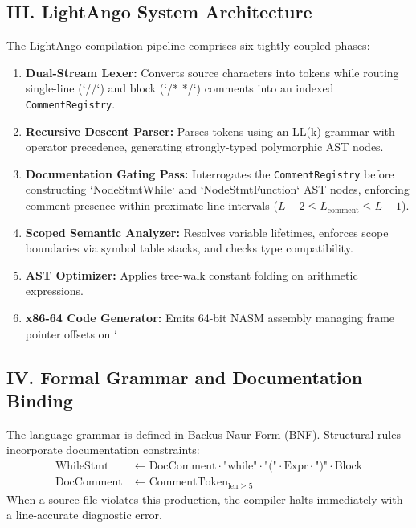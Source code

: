\subsection*{III. LightAngo System Architecture}
The LightAngo compilation pipeline comprises six tightly coupled phases:
\begin{enumerate}
    \item \textbf{Dual-Stream Lexer:} Converts source characters into tokens while routing single-line (`//`) and block (`/* */`) comments into an indexed \texttt{CommentRegistry}.
    \item \textbf{Recursive Descent Parser:} Parses tokens using an LL(k) grammar with operator precedence, generating strongly-typed polymorphic AST nodes.
    \item \textbf{Documentation Gating Pass:} Interrogates the \texttt{CommentRegistry} before constructing `NodeStmtWhile` and `NodeStmtFunction` AST nodes, enforcing comment presence within proximate line intervals ($L - 2 \le L_{\text{comment}} \le L - 1$).
    \item \textbf{Scoped Semantic Analyzer:} Resolves variable lifetimes, enforces scope boundaries via symbol table stacks, and checks type compatibility.
    \item \textbf{AST Optimizer:} Applies tree-walk constant folding on arithmetic expressions.
    \item \textbf{x86-64 Code Generator:} Emits 64-bit NASM assembly managing frame pointer offsets on `%
\end{enumerate}

\subsection*{IV. Formal Grammar and Documentation Binding}
The language grammar is defined in Backus-Naur Form (BNF). Structural rules incorporate documentation constraints:
\begin{align*}
\text{WhileStmt} &\leftarrow \text{DocComment} \cdot \text{"while"} \cdot \text{"("} \cdot \text{Expr} \cdot \text{")"} \cdot \text{Block} \\
\text{DocComment} &\leftarrow \text{CommentToken}_{\text{len} \ge 5}
\end{align*}
When a source file violates this production, the compiler halts immediately with a line-accurate diagnostic error.

